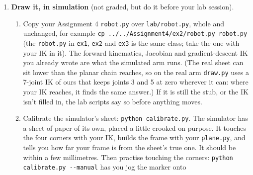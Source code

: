 \documentclass{16384_doc}
\begin{document}
\begin{questions}
\begin{enumerate}[label=\alph*.]
        inverse, written without a matrix inverse.  These three are autograded,
        on randomly perturbed corners as in Question~1.  Then check them before
        going anywhere near the arm:
        \begin{verbatim}
python check_plane.py
\end{verbatim}
        It tries your frame on sheets whose answer is known (flat, turned,
        tilted, a whiteboard standing up), on noisy touches checked against
        every property the formula promises, and on the graded cases, the same
        ones \verb!local_autograder.py -p plane! runs from \verb!code/!.  Every
        failure says what is wrong.  A wrong frame sends the marker
        into the table, so do not take the lab past this point until it reports
        no failures.

        \item \textbf{Draw it, in simulation} (not graded, but do it before your
        lab session).
        \begin{enumerate}[label=(\roman*)]
            \item Copy your Assignment 4 \verb!robot.py! over
                  \verb!lab/robot.py!, whole and unchanged, for example
                  \verb!cp ../../Assignment4/ex2/robot.py robot.py! (the
                  \verb!robot.py! in \verb!ex1!, \verb!ex2! and \verb!ex3! is the
                  same class; take the one with your IK in it).  The forward
                  kinematics, Jacobian and gradient-descent IK you already wrote
                  are what the simulated arm runs.  (The real sheet can sit lower
                  than the planar chain reaches, so on the real arm
                  \verb!draw.py! uses a 7-joint IK of ours that keeps joints 3
                  and 5 at zero wherever it can: where your IK reaches, it finds
                  the same answer.)  If it is still the stub, or the IK isn't
                  filled in, the lab scripts say so before anything moves.
            \item Calibrate the simulator's sheet: \verb!python calibrate.py!.
                  The simulator has a sheet of paper of its own, placed a little
                  crooked on purpose.  It touches the four corners with your IK,
                  builds the frame with your \verb!plane.py!, and tells you how far
                  your frame is from the sheet's true one.  It should be within a
                  few millimetres.  Then practise touching the corners:
                  \verb!python calibrate.py --manual! has you jog the marker onto

\end{enumerate}
\end{enumerate}
\end{questions}
\end{document}
